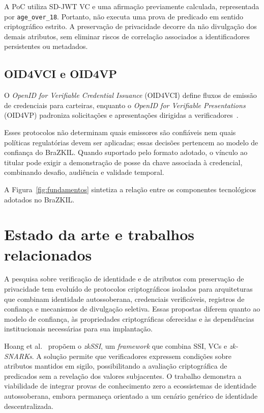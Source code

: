 \documentclass[12pt]{article}
\begin{document}
A PoC utiliza SD-JWT VC e uma afirmação previamente calculada, representada por \texttt{age\_over\_18}. Portanto, não executa uma prova de predicado em sentido criptográfico estrito. A preservação de privacidade decorre da não divulgação dos demais atributos, sem eliminar riscos de correlação associados a identificadores persistentes ou metadados.

\subsection{OID4VCI e OID4VP}

O \textit{OpenID for Verifiable Credential Issuance} (OID4VCI) define fluxos de emissão de credenciais para carteiras, enquanto o \textit{OpenID for Verifiable Presentations} (OID4VP) padroniza solicitações e apresentações dirigidas a verificadores~\cite{openid4vci2024,openid4vp2023}.

Esses protocolos não determinam quais emissores são confiáveis nem quais políticas regulatórias devem ser aplicadas; essas decisões pertencem ao modelo de confiança do BraZKIL. Quando suportado pelo formato adotado, o vínculo ao titular pode exigir a demonstração de posse da chave associada à credencial, combinando desafio, audiência e validade temporal.

A Figura~\ref{fig:fundamentos} sintetiza a relação entre os componentes tecnológicos adotados no BraZKIL.




\section{Estado da arte e trabalhos relacionados}
\label{sec:estado-arte}

A pesquisa sobre verificação de identidade e de atributos com preservação de privacidade tem evoluído de protocolos criptográficos isolados para arquiteturas que combinam identidade autossoberana, credenciais verificáveis, registros de confiança e mecanismos de divulgação seletiva. Essas propostas diferem quanto ao modelo de confiança, às propriedades criptográficas oferecidas e às dependências institucionais necessárias para sua implantação.

Hoang et al.~\cite{hoang2024zkssi} propõem o \textit{zkSSI}, um \textit{framework} que combina SSI, VCs e \textit{zk-SNARKs}. A solução permite que verificadores expressem condições sobre atributos mantidos em sigilo, possibilitando a avaliação criptográfica de predicados sem a revelação dos valores subjacentes. O trabalho demonstra a viabilidade de integrar provas de conhecimento zero a ecossistemas de identidade autossoberana, embora permaneça orientado a um cenário genérico de identidade descentralizada.
\end{document}
